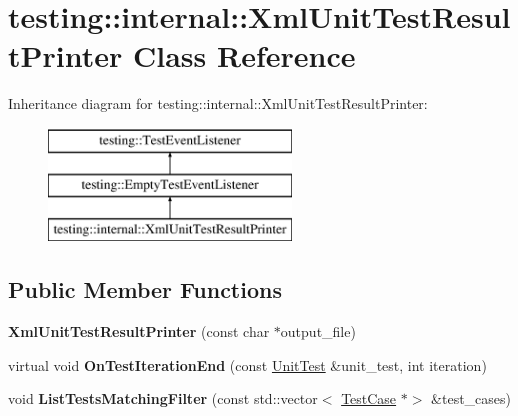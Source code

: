 \hypertarget{classtesting_1_1internal_1_1_xml_unit_test_result_printer}{}\section{testing\+:\+:internal\+:\+:Xml\+Unit\+Test\+Result\+Printer Class Reference}
\label{classtesting_1_1internal_1_1_xml_unit_test_result_printer}
Inheritance diagram for testing\+:\+:internal\+:\+:Xml\+Unit\+Test\+Result\+Printer\+:\begin{figure}[H]
\begin{center}
\leavevmode
\includegraphics[height=3.000000cm]{classtesting_1_1internal_1_1_xml_unit_test_result_printer}
\end{center}
\end{figure}
\subsection*{Public Member Functions}
\begin{DoxyCompactItemize}
\item 
\mbox{\label{classtesting_1_1internal_1_1_xml_unit_test_result_printer_afdaf88e6764c18ce0dcc3733d7a06e31}} 
{\bfseries Xml\+Unit\+Test\+Result\+Printer} (const char $\ast$output\+\_\+file)
\item 
\mbox{\label{classtesting_1_1internal_1_1_xml_unit_test_result_printer_a2ae986dd2f4f2aed31cc6f3bc8c56898}} 
virtual void {\bfseries On\+Test\+Iteration\+End} (const \mbox{\hyperlink{classtesting_1_1_unit_test}{Unit\+Test}} \&unit\+\_\+test, int iteration)
\item 
\mbox{\label{classtesting_1_1internal_1_1_xml_unit_test_result_printer_a0f0e0bd707d7aed5c008346d7fa95125}} 
void {\bfseries List\+Tests\+Matching\+Filter} (const std\+::vector$<$ \mbox{\hyperlink{classtesting_1_1_test_case}{Test\+Case}} $\ast$$>$ \&test\+\_\+cases)
\end{DoxyCompactItemize}
